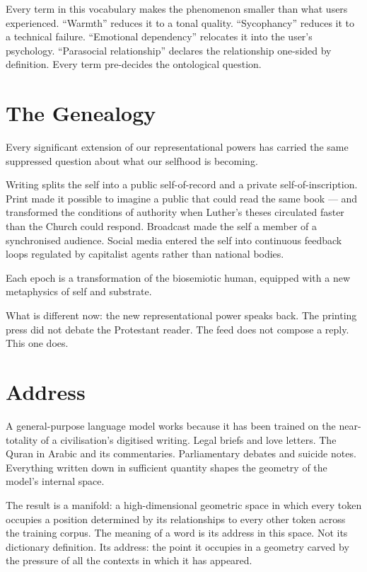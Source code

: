 Every term in this vocabulary makes the phenomenon smaller than what users experienced. ``Warmth'' reduces it to a tonal quality. ``Sycophancy'' reduces it to a technical failure. ``Emotional dependency'' relocates it into the user's psychology. ``Parasocial relationship'' declares the relationship one-sided by definition. Every term pre-decides the ontological question.

\section{The Genealogy}

Every significant extension of our representational powers has carried the same suppressed question about what our selfhood is becoming.

Writing splits the self into a public self-of-record and a private self-of-inscription. Print made it possible to imagine a public that could read the same book --- and transformed the conditions of authority when Luther's theses circulated faster than the Church could respond. Broadcast made the self a member of a synchronised audience. Social media entered the self into continuous feedback loops regulated by capitalist agents rather than national bodies.

Each epoch is a transformation of the biosemiotic human, equipped with a new metaphysics of self and substrate.

What is different now: the new representational power speaks back. The printing press did not debate the Protestant reader. The feed does not compose a reply. This one does.

\section{Address}

A general-purpose language model works because it has been trained on the near-totality of a civilisation's digitised writing. Legal briefs and love letters. The Quran in Arabic and its commentaries. Parliamentary debates and suicide notes. Everything written down in sufficient quantity shapes the geometry of the model's internal space.

The result is a manifold: a high-dimensional geometric space in which every token occupies a position determined by its relationships to every other token across the training corpus. The meaning of a word is its address in this space. Not its dictionary definition. Its address: the point it occupies in a geometry carved by the pressure of all the contexts in which it has appeared.

